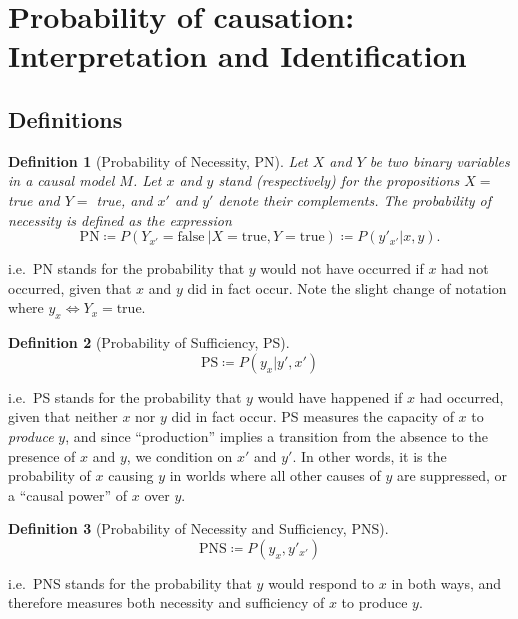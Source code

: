 \documentclass[11pt]{article}
\numberwithin{equation}{section}
\newcommand{\defeq}{\coloneqq}
\newtheorem{defn}{Definition}[section]
\begin{document}
\section{Probability of causation: Interpretation and Identification}

\subsection{Definitions}

\begin{defn}[Probability of Necessity, PN]
Let $X$ and $Y$ be two binary variables in a causal model $M$. Let $x$ and $y$ stand (respectively) for the propositions $X=$ true and $Y=$ true, and $x'$ and $y'$ denote their complements. The probability of necessity is defined as the expression
\begin{equation}
\text{PN} \defeq P(Y_{x'}=\text{false}\ | X=\text{true}, Y=\text{true}) \defeq P(y'_{x'}|x,y).
\end{equation}
\end{defn}
\noindent i.e.\ PN stands for the probability that $y$ would not have occurred if $x$ had not occurred, given that $x$ and $y$ did in fact occur. Note the slight change of notation where $y_x \iff Y_x=\text{true}$.

\begin{defn}[Probability of Sufficiency, PS]
\begin{equation}
\text{PS} \defeq P(y_x|y',x')
\end{equation}
\end{defn}
\noindent i.e.\ PS stands for the probability that $y$ would have happened if $x$ had occurred, given that neither $x$ nor $y$ did in fact occur. PS measures the capacity of $x$ to \textit{produce} $y$, and since ``production'' implies a transition from the absence to the presence of $x$ and $y$, we condition on $x'$ and $y'$. In other words, it is the probability of $x$ causing $y$ in worlds where all other causes of $y$ are suppressed, or a ``causal power'' of $x$ over $y$.

\begin{defn}[Probability of Necessity and Sufficiency, PNS]
\begin{equation}
\text{PNS} \defeq P(y_x, y'_{x'})
\end{equation}
\end{defn}
\noindent i.e.\ PNS stands for the probability that $y$ would respond to $x$ in both ways, and therefore measures both necessity and sufficiency of $x$ to produce $y$.
\end{document}
